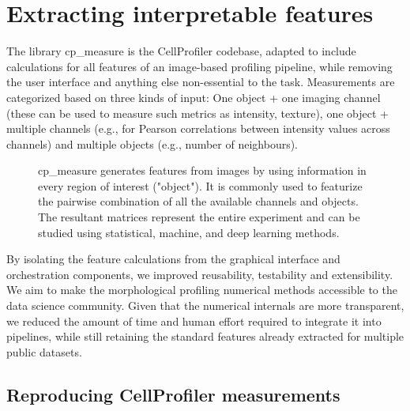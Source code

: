 \documentclass{article}
\begin{document}
\section{Extracting interpretable features}
\label{sec:org61842b5}
The library cp\_measure is  the CellProfiler codebase, adapted to include calculations for all features of an image-based profiling pipeline, while removing the user interface and anything else non-essential to the task. Measurements are categorized based on three kinds of input: One object + one imaging channel (these can be used to measure such metrics as intensity, texture), one object + multiple channels (e.g., for Pearson correlations between intensity values across channels) and multiple objects (e.g., number of neighbours).

\begin{figure}[htbp]
\centering

\caption{\label{fig:overview}cp\_measure generates features from images by using information in every region of interest ("object"). It is commonly used to featurize the pairwise combination of all the available channels and objects. The resultant matrices represent the entire experiment and can be studied using statistical, machine, and deep learning methods.}
\end{figure}

By isolating the feature calculations from the graphical interface and orchestration components, we improved reusability, testability and extensibility. We aim to make the morphological profiling numerical methods accessible to the data science community. Given that the numerical internals are more transparent, we reduced the amount of time and human effort required to integrate it into pipelines, while still retaining the standard features already extracted for multiple public datasets.

\subsection{Reproducing CellProfiler measurements}
\label{sec:org09b0cd2}
\end{document}
